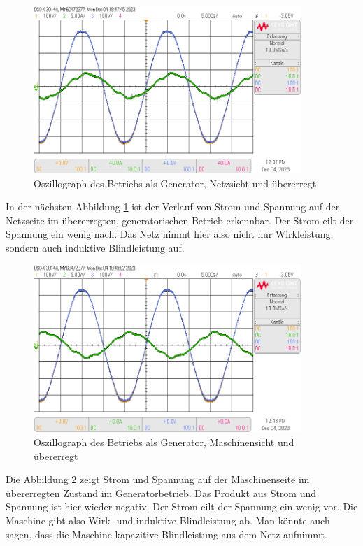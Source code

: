 \documentclass{report}
\begin{document}
\begin{figure}[!ht]
	\centering
	\includegraphics[width=0.9\textwidth]{./assets/img/synchronisation_netz_generator_uee_vzp.png}
	\caption{Oszillograph des Betriebs als Generator, Netzsicht und übererregt}
	\label{fig:sngue}
\end{figure}

In der nächsten Abbildung \ref{fig:sngue} ist der Verlauf von Strom und Spannung auf der Netzseite im übererregten, generatorischen Betrieb erkennbar. Der Strom eilt der Spannung ein wenig nach. Das Netz nimmt hier also nicht nur Wirkleistung, sondern auch induktive Blindleistung auf.

\begin{figure}[!ht]
	\centering
	\includegraphics[width=0.9\textwidth]{./assets/img/synchronisation_maschine_generator_uee_vzp.png}
	\caption{Oszillograph des Betriebs als Generator, Maschinensicht und übererregt}
	\label{fig:smgue}
\end{figure}

Die Abbildung \ref{fig:smgue} zeigt Strom und Spannung auf der Maschinenseite im übererregten Zustand im Generatorbetrieb. Das Produkt aus Strom und Spannung ist hier wieder negativ. Der Strom eilt der Spannung ein wenig vor. Die Maschine gibt also Wirk- und induktive Blindleistung ab. Man könnte auch sagen, dass die Maschine kapazitive Blindleistung aus dem Netz aufnimmt.
\end{document}
